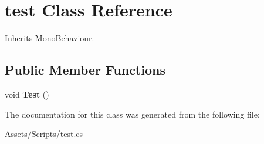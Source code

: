\hypertarget{classtest}{\section{test Class Reference}
\label{classtest}
}


Inherits Mono\-Behaviour.

\subsection*{Public Member Functions}
\begin{DoxyCompactItemize}
\item 
\hypertarget{classtest_aaa2fe35310783f5e54d9b7f2bc361501}{void {\bfseries Test} ()}\label{classtest_aaa2fe35310783f5e54d9b7f2bc361501}

\end{DoxyCompactItemize}


The documentation for this class was generated from the following file\-:\begin{DoxyCompactItemize}
\item 
Assets/\-Scripts/test.\-cs\end{DoxyCompactItemize}
